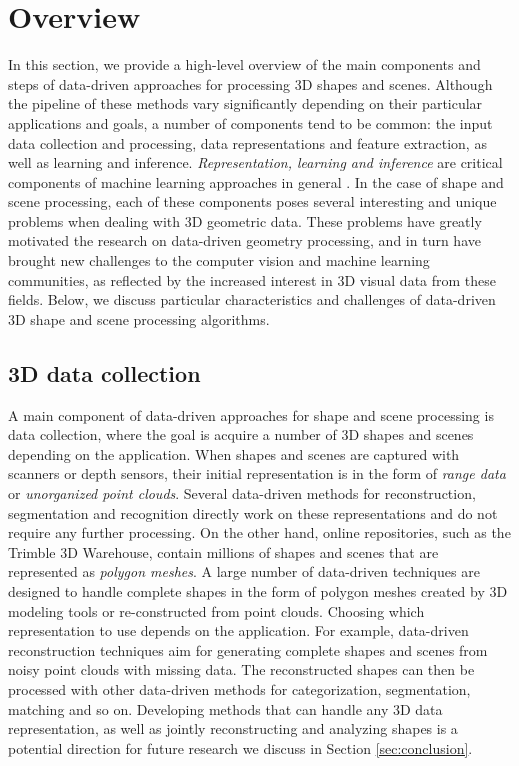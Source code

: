 \section{Overview}
\label{sec:overview}

In this section, we provide a high-level overview of the main components and steps of data-driven approaches for processing 3D shapes and scenes. Although the pipeline of these methods vary significantly depending on their particular applications and goals, a number of components tend to be common: the input data collection and processing, data representations and feature extraction, as well as learning and inference. \emph{Representation, learning and inference} are critical components of machine learning approaches in general \cite{Koller:2009:PGM}. In the case of shape and scene processing, each of these components poses several interesting and unique problems when dealing with 3D geometric data. These problems have greatly motivated the research on data-driven geometry processing, and in turn have brought new challenges to the computer vision and machine learning communities, as reflected by the increased interest in 3D visual data from these fields. Below, we discuss particular characteristics and challenges of data-driven 3D shape and scene processing algorithms.



\subsection{3D data collection}

 A main component of data-driven approaches for shape and scene processing is data collection, where the goal is acquire a number of 3D shapes and scenes depending on the application. When shapes and scenes are captured with scanners or depth sensors, their initial representation is in the form of \emph{range data} or \emph{unorganized point clouds}. Several data-driven methods for reconstruction, segmentation and recognition directly work on these representations and do not require any further processing. On the other hand, online repositories, such as the Trimble 3D Warehouse, contain millions of shapes and scenes that are represented as \emph{polygon meshes}. A large number of data-driven techniques are designed to handle complete shapes in the form of polygon meshes created by 3D modeling tools or re-constructed from point clouds. Choosing which representation to use depends on the application. For example, data-driven reconstruction techniques aim for generating complete shapes and scenes from noisy point clouds with missing data. The reconstructed shapes can then be processed with other data-driven methods for categorization, segmentation, matching and so on. Developing methods that can handle any 3D data representation, as well as jointly reconstructing and analyzing shapes is a potential direction for future research we discuss in Section \ref{sec:conclusion}.

